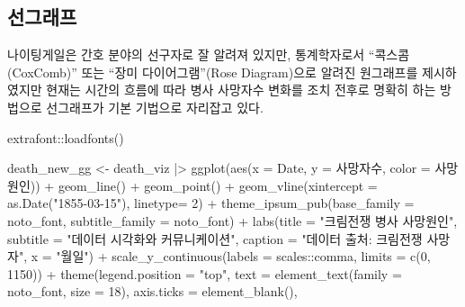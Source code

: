 \documentclass[
  letterpaper,
  chapter,a4paper,showtrims,openright,hidelinks]{oblivoir}
\newenvironment{Shaded}{\begin{snugshade}}{\end{snugshade}}
\newcommand{\AttributeTok}[1]{\textcolor[rgb]{0.40,0.45,0.13}{#1}}
\newcommand{\DecValTok}[1]{\textcolor[rgb]{0.68,0.00,0.00}{#1}}
\newcommand{\FunctionTok}[1]{\textcolor[rgb]{0.28,0.35,0.67}{#1}}
\newcommand{\NormalTok}[1]{\textcolor[rgb]{0.00,0.23,0.31}{#1}}
\newcommand{\OtherTok}[1]{\textcolor[rgb]{0.00,0.23,0.31}{#1}}
\newcommand{\SpecialCharTok}[1]{\textcolor[rgb]{0.37,0.37,0.37}{#1}}
\newcommand{\StringTok}[1]{\textcolor[rgb]{0.13,0.47,0.30}{#1}}
\begin{document}
\hypertarget{uxc120uxadf8uxb798uxd504}{%
\subsection{선그래프}\label{uxc120uxadf8uxb798uxd504}}

나이팅게일은 간호 분야의 선구자로 잘 알려져 있지만, 통계학자로서
``콕스콤(CoxComb)'' 또는 ``장미 다이어그램''(Rose Diagram)으로 알려진
원그래프를 제시하였지만 현재는 시간의 흐름에 따라 병사 사망자수 변화를
조치 전후로 명확히 하는 방법으로 선그래프가 기본 기법으로 자리잡고 있다.

\begin{Shaded}
\begin{Highlighting}[]
\NormalTok{extrafont}\SpecialCharTok{::}\FunctionTok{loadfonts}\NormalTok{()}

\NormalTok{death\_new\_gg }\OtherTok{\textless{}{-}}\NormalTok{ death\_viz }\SpecialCharTok{|\textgreater{}} 
  \FunctionTok{ggplot}\NormalTok{(}\FunctionTok{aes}\NormalTok{(}\AttributeTok{x =}\NormalTok{ Date, }\AttributeTok{y =}\NormalTok{ 사망자수, }\AttributeTok{color =}\NormalTok{ 사망원인)) }\SpecialCharTok{+}
    \FunctionTok{geom\_line}\NormalTok{() }\SpecialCharTok{+}
    \FunctionTok{geom\_point}\NormalTok{() }\SpecialCharTok{+}
    \FunctionTok{geom\_vline}\NormalTok{(}\AttributeTok{xintercept =} \FunctionTok{as.Date}\NormalTok{(}\StringTok{"1855{-}03{-}15"}\NormalTok{), }\AttributeTok{linetype=} \DecValTok{2}\NormalTok{) }\SpecialCharTok{+}
    \FunctionTok{theme\_ipsum\_pub}\NormalTok{(}\AttributeTok{base\_family =}\NormalTok{ noto\_font, }\AttributeTok{subtitle\_family =}\NormalTok{ noto\_font) }\SpecialCharTok{+}
    \FunctionTok{labs}\NormalTok{(}\AttributeTok{title =} \StringTok{"크림전쟁 병사 사망원인"}\NormalTok{, }
         \AttributeTok{subtitle =} \StringTok{"데이터 시각화와 커뮤니케이션"}\NormalTok{, }
         \AttributeTok{caption =} \StringTok{"데이터 출처: 크림전쟁 사망자"}\NormalTok{,}
         \AttributeTok{x =} \StringTok{"월일"}\NormalTok{) }\SpecialCharTok{+} 
    \FunctionTok{scale\_y\_continuous}\NormalTok{(}\AttributeTok{labels =}\NormalTok{ scales}\SpecialCharTok{::}\NormalTok{comma, }\AttributeTok{limits =} \FunctionTok{c}\NormalTok{(}\DecValTok{0}\NormalTok{, }\DecValTok{1150}\NormalTok{)) }\SpecialCharTok{+}
    \FunctionTok{theme}\NormalTok{(}\AttributeTok{legend.position =} \StringTok{"top"}\NormalTok{, }
          \AttributeTok{text =} \FunctionTok{element\_text}\NormalTok{(}\AttributeTok{family =}\NormalTok{ noto\_font, }\AttributeTok{size =} \DecValTok{18}\NormalTok{),}
          \AttributeTok{axis.ticks =} \FunctionTok{element\_blank}\NormalTok{(),}

\end{Highlighting}
\end{Shaded}
\end{document}

